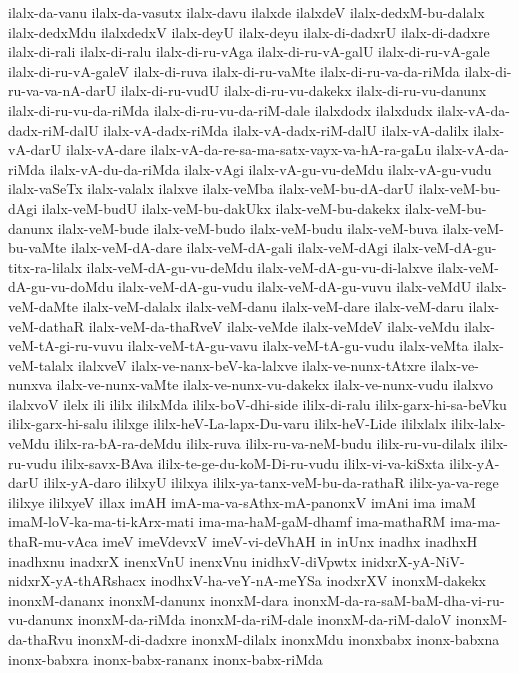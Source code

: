 {ilalx-da-vanu
ilalx-da-vasutx
ilalx-davu
ilalxde
ilalxdeV
ilalx-dedxM-bu-dalalx
ilalx-dedxMdu
ilalxdedxV
ilalx-deyU
ilalx-deyu
ilalx-di-dadxrU
ilalx-di-dadxre
ilalx-di-rali
ilalx-di-ralu
ilalx-di-ru-vAga
ilalx-di-ru-vA-galU
ilalx-di-ru-vA-gale
ilalx-di-ru-vA-galeV
ilalx-di-ruva
ilalx-di-ru-vaMte
ilalx-di-ru-va-da-riMda
ilalx-di-ru-va-va-nA-darU
ilalx-di-ru-vudU
ilalx-di-ru-vu-dakekx
ilalx-di-ru-vu-danunx
ilalx-di-ru-vu-da-riMda
ilalx-di-ru-vu-da-riM-dale
ilalxdodx
ilalxdudx
ilalx-vA-da-dadx-riM-dalU
ilalx-vA-dadx-riMda
ilalx-vA-dadx-riM-dalU
ilalx-vA-dalilx
ilalx-vA-darU
ilalx-vA-dare
ilalx-vA-da-re-sa-ma-satx-vayx-va-hA-ra-gaLu
ilalx-vA-da-riMda
ilalx-vA-du-da-riMda
ilalx-vAgi
ilalx-vA-gu-vu-deMdu
ilalx-vA-gu-vudu
ilalx-vaSeTx
ilalx-valalx
ilalxve
ilalx-veMba
ilalx-veM-bu-dA-darU
ilalx-veM-bu-dAgi
ilalx-veM-budU
ilalx-veM-bu-dakUkx
ilalx-veM-bu-dakekx
ilalx-veM-bu-danunx
ilalx-veM-bude
ilalx-veM-budo
ilalx-veM-budu
ilalx-veM-buva
ilalx-veM-bu-vaMte
ilalx-veM-dA-dare
ilalx-veM-dA-gali
ilalx-veM-dAgi
ilalx-veM-dA-gu-titx-ra-lilalx
ilalx-veM-dA-gu-vu-deMdu
ilalx-veM-dA-gu-vu-di-lalxve
ilalx-veM-dA-gu-vu-doMdu
ilalx-veM-dA-gu-vudu
ilalx-veM-dA-gu-vuvu
ilalx-veMdU
ilalx-veM-daMte
ilalx-veM-dalalx
ilalx-veM-danu
ilalx-veM-dare
ilalx-veM-daru
ilalx-veM-dathaR
ilalx-veM-da-thaRveV
ilalx-veMde
ilalx-veMdeV
ilalx-veMdu
ilalx-veM-tA-gi-ru-vuvu
ilalx-veM-tA-gu-vavu
ilalx-veM-tA-gu-vudu
ilalx-veMta
ilalx-veM-talalx
ilalxveV
ilalx-ve-nanx-beV-ka-lalxve
ilalx-ve-nunx-tAtxre
ilalx-ve-nunxva
ilalx-ve-nunx-vaMte
ilalx-ve-nunx-vu-dakekx
ilalx-ve-nunx-vudu
ilalxvo
ilalxvoV
ilelx
ili
ililx
ililxMda
ililx-boV-dhi-side
ililx-di-ralu
ililx-garx-hi-sa-beVku
ililx-garx-hi-salu
ililxge
ililx-heV-La-lapx-Du-varu
ililx-heV-Lide
ililxlalx
ililx-lalx-veMdu
ililx-ra-bA-ra-deMdu
ililx-ruva
ililx-ru-va-neM-budu
ililx-ru-vu-dilalx
ililx-ru-vudu
ililx-savx-BAva
ililx-te-ge-du-koM-Di-ru-vudu
ililx-vi-va-kiSxta
ililx-yA-darU
ililx-yA-daro
ililxyU
ililxya
ililx-ya-tanx-veM-bu-da-rathaR
ililx-ya-va-rege
ililxye
ililxyeV
illax
imAH
imA-ma-va-sAthx-mA-panonxV
imAni
ima
imaM
imaM-loV-ka-ma-ti-kArx-mati
ima-ma-haM-gaM-dhamf
ima-mathaRM
ima-ma-thaR-mu-vAca
imeV
imeVdevxV
imeV-vi-deVhAH
in
inUnx
inadhx
inadhxH
inadhxnu
inadxrX
inenxVnU
inenxVnu
inidhxV-diVpwtx
inidxrX-yA-NiV-nidxrX-yA-thARshacx
inodhxV-ha-veY-nA-meYSa
inodxrXV
inonxM-dakekx
inonxM-dananx
inonxM-danunx
inonxM-dara
inonxM-da-ra-saM-baM-dha-vi-ru-vu-danunx
inonxM-da-riMda
inonxM-da-riM-dale
inonxM-da-riM-daloV
inonxM-da-thaRvu
inonxM-di-dadxre
inonxM-dilalx
inonxMdu
inonxbabx
inonx-babxna
inonx-babxra
inonx-babx-rananx
inonx-babx-riMda
}
